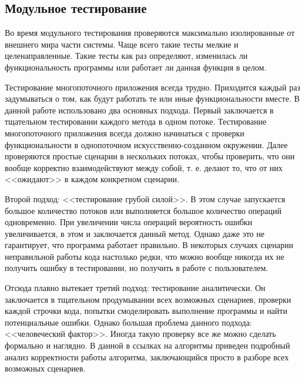 \documentclass[12pt]{article}
\begin{document}
{				\subsection{Модульное тестирование}
					\par Во время модульного тестирования проверяются максимально изолированные от внешнего мира части системы. Чаще всего такие тесты мелкие и целенаправленные. Такие тесты как раз определяют, изменилась ли функциональность программы или работает ли данная функция в целом.
					\par Тестирование многопоточного приложения всегда трудно. Приходится каждый раз задумываться о том, как будут работать те или иные функциональности вместе. В данной работе использовано два основных подхода. Первый заключается в тщательном тестировании каждого метода в одном потоке. Тестирование многопоточного приложения всегда должно начинаться с проверки функциональности в однопоточном искусственно-созданном окружении. Далее проверяются простые сценарии в нескольких потоках, чтобы проверить, что они вообще корректно взаимодействуют между собой, т. е. делают то, что от них <<ожидают>> в каждом конкретном сценарии.
					\par Второй подход: <<тестирование грубой силой>>. В этом случае запускается большое количество потоков или выполняется большое количество операций одновременно. При увеличении числа операций вероятность ошибки увеличивается, в этом и заключается данный метод. Однако даже это не гарантирует, что программа работает правильно. В некоторых случаях сценарии неправильной работы кода настолько редки, что можно вообще никогда их не получить ошибку в тестировании, но получить в работе с пользователем.
					\par Отсюда плавно вытекает третий подход: тестирование аналитически. Он заключается в тщательном продумывании всех возможных сценариев, проверки каждой строчки кода, попытки смоделировать выполнение программы и найти потенциальные ошибки. Однако большая проблема данного подхода: <<человеческий фактор>>. Иногда такую проверку все же можно сделать формально и наглядно. В данной в ссылках на алгоритмы приведен подробный анализ корректности работы алгоритма, заключающийся просто в разборе всех возможных сценариев.
}
\end{document}
